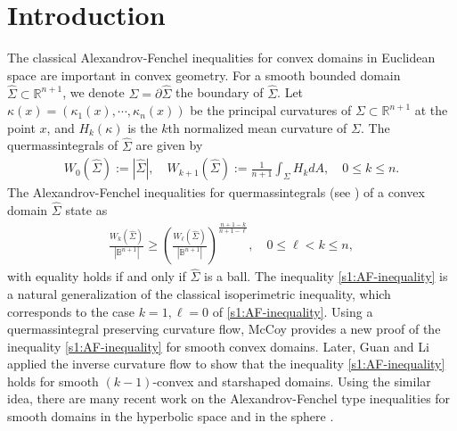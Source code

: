 \documentclass[11pt,reqno]{amsart}
\theoremstyle{definition}
\theoremstyle{remark}
\numberwithin{equation}{section}
\renewcommand{\(}{\left(}
\renewcommand{\)}{\right)}
\renewcommand{\-}{\overline}
\renewcommand{\k}{\kappa}
\begin{document}
\section{Introduction}
The classical Alexandrov-Fenchel inequalities for convex domains in Euclidean space are important in convex geometry. For a smooth bounded domain $\widehat{\Sigma}\subset \mathbb R^{n+1}$, we denote $\Sigma=\partial \widehat{\Sigma}$ the boundary of $\widehat{\Sigma}$. Let $\k(x)=(\k_1(x),\cdots,\k_n(x))$ be the principal curvatures of $\Sigma\subset \mathbb R^{n+1}$ at the point $x$, and $H_k(\k)$ is the $k$th normalized mean curvature of $\Sigma$. The quermassintegrals of $\widehat{\Sigma}$ are given by
\begin{align}\label{s1:def-quermassintegral-closed}
W_0(\widehat{\Sigma}):=|\widehat{\Sigma}|, \quad W_{k+1}(\widehat{\Sigma}):=\frac{1}{n+1}\int_{\Sigma} H_{k} dA, \quad 0\leq k\leq n.
\end{align}
The Alexandrov-Fenchel inequalities for quermassintegrals (see \cite{Schn}) of a convex domain $\widehat{\Sigma}$ state as
\begin{align}\label{s1:AF-inequality}
\frac{W_k(\widehat{\Sigma})}{|\mathbb B^{n+1}|} \geq \(\frac{W_\ell(\widehat{\Sigma})}{|\mathbb B^{n+1}|}\)^\frac{n+1-k}{n+1-\ell}, \quad 0\leq \ell<k\leq n,
\end{align}
with equality holds if and only if $\widehat{\Sigma}$ is a ball. The inequality \eqref{s1:AF-inequality} is a natural generalization of the classical isoperimetric inequality, which corresponds to the case $k=1, \ell=0$ of \eqref{s1:AF-inequality}. Using a quermassintegral preserving curvature flow, McCoy \cite{McC05} provides a new proof of the inequality \eqref{s1:AF-inequality} for smooth convex domains. Later,  Guan and Li \cite{GL09} applied the inverse curvature flow \cite{Ger1990,Urbas1991} to show that the inequality \eqref{s1:AF-inequality} holds for smooth $(k-1)$-convex and starshaped domains. Using the similar idea, there are many recent work on the Alexandrov-Fenchel type inequalities for smooth domains in the hyperbolic space \cite{ACW20,AHL2020,BGL,GL-2021,GWW14,HL18,HLW2020,LWX14,Wang-Xia2014} and in the sphere \cite{CS22,ChenGLS22,MS15,WeiX15}.
\end{document}
